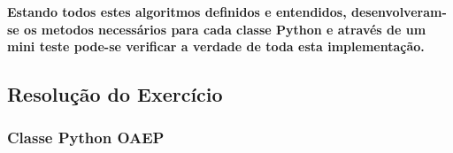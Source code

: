 \documentclass[12pt]{report}
\begin{document}
\textbf{Estando todos estes algoritmos definidos e entendidos, desenvolveram-se
os metodos necessários para cada classe Python e através de um mini
teste pode-se verificar a verdade de toda esta implementação.}
\vspace{5 mm}
\subsection{Resolução do
Exercício}\label{resoluuxe7uxe3o-do-exercuxedcio}
\vspace{5 mm}
    \subsubsection{\texorpdfstring{Classe Python
\textbf{OAEP}}{Classe Python OAEP}}\label{classe-python-oaep}
\vspace{2 mm}
\end{document}
